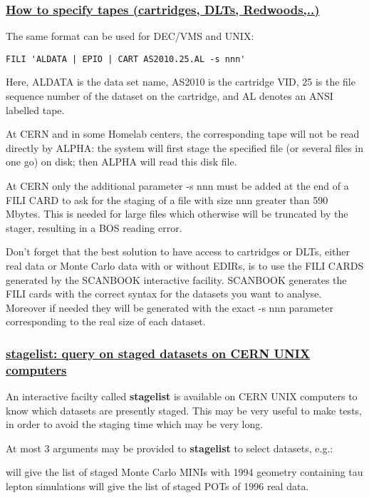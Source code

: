 \subsubsection{\underline{How to specify tapes (cartridges, DLTs, Redwoods,..)}}
\par
The same format can be used for DEC/VMS and UNIX:
\begin{verbatim}
FILI 'ALDATA | EPIO | CART AS2010.25.AL -s nnn'
\end{verbatim}
Here, ALDATA is the data set name, AS2010 is the cartridge VID,
25 is the file sequence number of the dataset on the cartridge, and AL denotes an ANSI labelled tape.

At CERN and in some Homelab centers, the corresponding tape will not be read directly by ALPHA: the system will
first stage the specified file (or several files in one go) on disk; then ALPHA will read this disk file.

\par
At CERN only the additional parameter  -s nnn  must be
added at the end of a FILI CARD to ask for the staging of a file with size nnn greater
than 590 Mbytes. This is needed for large files which otherwise will be truncated by the stager, resulting in a BOS reading
error.
 
\par
 
Don't forget that the best solution to have access to cartridges or DLTs, either real data or
Monte Carlo data  with or without EDIRs, is to use the FILI CARDS
generated by the SCANBOOK interactive facility.
SCANBOOK generates the FILI cards with the correct syntax for the
datasets you want to analyse. Moreover if needed they will be generated
with the exact -s nnn parameter corresponding to the real size of each dataset.
\par
\subsubsection{\underline{stagelist: query on staged datasets on CERN UNIX computers}}

An interactive facilty called {\bf stagelist} is available on CERN UNIX computers to know which datasets are
presently staged. This may be very useful to make  tests, in order to avoid the staging time which may be very long.

At most 3 arguments may be provided to {\bf stagelist} to select datasets, e.g.:

\begin{indentlist}{ 4.50cm}{ 4.75cm}
 will give the list of staged Monte Carlo MINIs with 1994 geometry containing tau lepton simulations
 will give the list of staged POTs of 1996 real data.
\end{indentlist}


